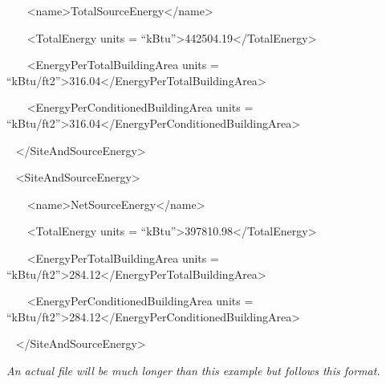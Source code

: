 ~~~ \textless{}name\textgreater{}TotalSourceEnergy\textless{}/name\textgreater{}

~~~ \textless{}TotalEnergy units = ``kBtu''\textgreater{}442504.19\textless{}/TotalEnergy\textgreater{}

~~~ \textless{}EnergyPerTotalBuildingArea units = ``kBtu/ft2''\textgreater{}316.04\textless{}/EnergyPerTotalBuildingArea\textgreater{}

~~~ \textless{}EnergyPerConditionedBuildingArea units = ``kBtu/ft2''\textgreater{}316.04\textless{}/EnergyPerConditionedBuildingArea\textgreater{}

~ \textless{}/SiteAndSourceEnergy\textgreater{}

~ \textless{}SiteAndSourceEnergy\textgreater{}

~~~ \textless{}name\textgreater{}NetSourceEnergy\textless{}/name\textgreater{}

~~~ \textless{}TotalEnergy units = ``kBtu''\textgreater{}397810.98\textless{}/TotalEnergy\textgreater{}

~~~ \textless{}EnergyPerTotalBuildingArea units = ``kBtu/ft2''\textgreater{}284.12\textless{}/EnergyPerTotalBuildingArea\textgreater{}

~~~ \textless{}EnergyPerConditionedBuildingArea units = ``kBtu/ft2''\textgreater{}284.12\textless{}/EnergyPerConditionedBuildingArea\textgreater{}

~ \textless{}/SiteAndSourceEnergy\textgreater{}

\emph{An actual file will be much longer than this example but follows this format.}

